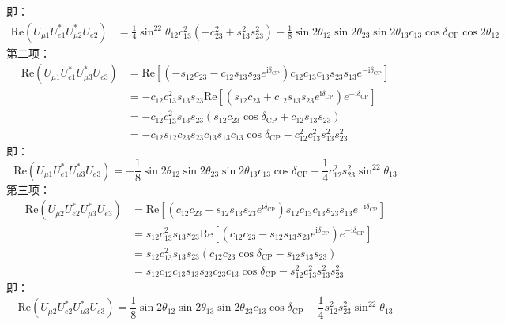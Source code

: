 \documentclass{article}
\newcommand{\ii}{\mathrm{i}}
\begin{document}
	即：
	\begin{equation*}
		\begin{aligned}
			\mathrm{Re}(U_{\mu 1}U_{e1}^*U_{\mu 2}^*U_{e2})&=\frac{1}{4}\sin^22\theta_{12}c_{13}^2(-c_{23}^2+s_{13}^2s_{23}^2)-\frac{1}{8}\sin2\theta_{12}\sin2\theta_{23}\sin2\theta_{13}c_{13}\cos\delta_{\mathrm{CP}}\cos2\theta_{12}
		\end{aligned}
	\end{equation*}
	第二项：
	\begin{equation*}
		\begin{aligned}
			\mathrm{Re}(U_{\mu 1}U_{e1}^*U_{\mu 3}^*U_{e3})&=\mathrm{Re}\left[(-s_{12}c_{23}-c_{12}s_{13}s_{23}e^{\ii\delta_{\mathrm{CP}}})c_{12}c_{13}c_{13}s_{23}s_{13}e^{-\ii\delta_\mathrm{CP}}\right]\\
			&=-c_{12}c_{13}^2s_{13}s_{23}\mathrm{Re}\left[(s_{12}c_{23}+c_{12}s_{13}s_{23}e^{\ii\delta_\mathrm{CP}})e^{-\ii\delta_\mathrm{CP}}\right]\\
			&=-c_{12}c_{13}^2s_{13}s_{23}(s_{12}c_{23}\cos\delta_\mathrm{CP}+c_{12}s_{13}s_{23})\\
			&=-c_{12}s_{12}c_{23}s_{23}c_{13}s_{13}c_{13}\cos\delta_\mathrm{CP}-c_{12}^2c_{13}^2s_{13}^2s_{23}^2
		\end{aligned}
	\end{equation*}
	即：
	\begin{equation*}
		\mathrm{Re}(U_{\mu 1}U_{e1}^*U_{\mu 3}^*U_{e3})=-\frac{1}{8}\sin2\theta_{12}\sin2\theta_{23}\sin2\theta_{13}c_{13}\cos\delta_\mathrm{CP}-\frac{1}{4}c_{12}^2s_{23}^2\sin^22\theta_{13}
	\end{equation*}
	第三项：
	\begin{equation*}
		\begin{aligned}
			\mathrm{Re}(U_{\mu 2}U_{e2}^*U_{\mu 3}^*U_{e3})&=\mathrm{Re}\left[(c_{12}c_{23}-s_{12}s_{13}s_{23}e^{\ii\delta_{\mathrm{CP}}})s_{12}c_{13}c_{13}s_{23}s_{13}e^{-\ii\delta_\mathrm{CP}}\right]\\
			&=s_{12}c_{13}^2s_{13}s_{23}\mathrm{Re}\left[(c_{12}c_{23}-s_{12}s_{13}s_{23}e^{\ii\delta_{\mathrm{CP}}})e^{-\ii\delta_\mathrm{CP}}\right]\\
			&=s_{12}c_{13}^2s_{13}s_{23}(c_{12}c_{23}\cos\delta_\mathrm{CP}-s_{12}s_{13}s_{23})\\
			&=s_{12}c_{12}c_{13}s_{13}s_{23}c_{23}c_{13}\cos\delta_\mathrm{CP}-s_{12}^2c_{13}^2s_{13}^2s_{23}^2
		\end{aligned}
	\end{equation*}
	即：
	\begin{equation*}
		\mathrm{Re}(U_{\mu 2}U_{e2}^*U_{\mu 3}^*U_{e3})=\frac{1}{8}\sin2\theta_{12}\sin2\theta_{13}\sin2\theta_{23}c_{13}\cos\delta_\mathrm{CP}-\frac{1}{4}s_{12}^2s_{23}^2\sin^22\theta_{13}
	\end{equation*}
\end{document}
